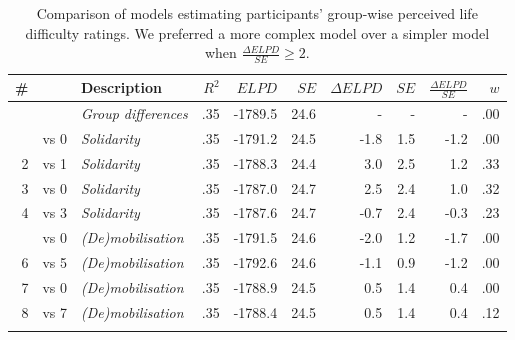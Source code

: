\documentclass[12pt, a4paper]{article}
\begin{document}
\begin{table}
\centering
{}
\caption{
Comparison of models estimating participants' group-wise perceived life difficulty ratings. We preferred a more complex model over a simpler model when $\frac{\Delta\textit{ELPD}}{\textit{SE}} \geq 2$.
}
\small	
\begin{tabularx}{\linewidth}{r@{~}rXrrrrrrr} \toprule
\# &  &  Description & $R^2$ & $\textit{ELPD}$ & $\textit{SE}$ & $\Delta\textit{ELPD}$ & $\textit{SE}$ & $\frac{\Delta\textit{ELPD}}{\textit{SE}}$ & $w$ \\ \midrule \addlinespace
0 &      & \textit{Group differences} & .35 & -1789.5 & 24.6 & - & - & - & .00 \\ \addlinespace
1 & vs 0 & \textit{Solidarity}       & .35 & -1791.2 & 24.5 & -1.8 & 1.5 & -1.2 & .00 \\
2 & vs 1 & \textit{Solidarity}       & .35 & -1788.3 & 24.4 & 3.0 & 2.5 & 1.2 & .33 \\
3 & vs 0 & \textit{Solidarity}       & .35 & -1787.0 & 24.7 & 2.5 & 2.4 & 1.0 & .32 \\
4 & vs 3 & \textit{Solidarity}       & .35 & -1787.6 & 24.7 & -0.7 & 2.4 & -0.3 & .23 \\ \addlinespace
5 & vs 0 & \textit{(De)mobilisation} & .35 & -1791.5 & 24.6 & -2.0 & 1.2 & -1.7 & .00 \\
6 & vs 5 & \textit{(De)mobilisation} & .35 & -1792.6 & 24.6 & -1.1 & 0.9 & -1.2 & .00 \\
7 & vs 0 & \textit{(De)mobilisation} & .35 & -1788.9 & 24.5 & 0.5 & 1.4 & 0.4 & .00 \\
8 & vs 7 & \textit{(De)mobilisation} & .35 & -1788.4 & 24.5 & 0.5 & 1.4 & 0.4 & .12 \\ \addlinespace \bottomrule
\end{tabularx}
\label{tab:ch5-s4-2}
\end{table}
\end{document}
